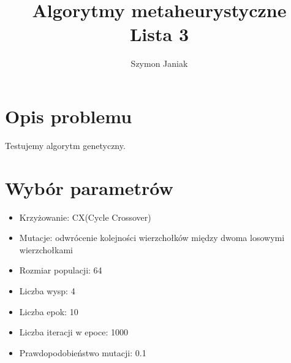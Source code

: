 \documentclass{article}
\begin{document}
\title{Algorytmy metaheurystyczne\\
\large Lista 3}
\author{Szymon Janiak}

\maketitle

\section*{Opis problemu}
    Testujemy algorytm genetyczny.

\section*{Wybór parametrów}
\begin{itemize}
    \item Krzyżowanie: CX(Cycle Crossover)
    \item Mutacje: odwrócenie kolejności wierzchołków między dwoma losowymi wierzchołkami
    \item Rozmiar populacji: 64
    \item Liczba wysp: 4
    \item Liczba epok: 10
    \item Liczba iteracji w epoce: 1000
    \item Prawdopodobieństwo mutacji: 0.1
\end{itemize}
\end{document}
